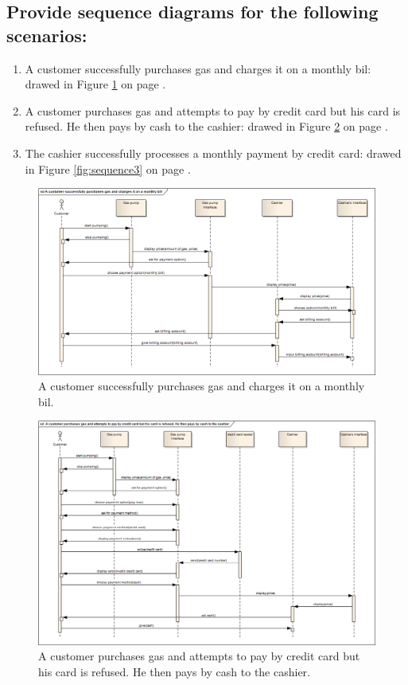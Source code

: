 \documentclass[11pt,a4paper]{article}
\begin{document}
\subsection*{Provide sequence diagrams for the following scenarios:}
\begin{enumerate}
	\item A customer successfully purchases gas and charges it on a monthly bil: drawed in Figure \ref{fig:sequence1} on page \pageref{fig:sequence1}.
	\item A customer purchases gas and attempts to pay by credit card but his card is refused. He then pays by cash to the cashier: drawed in Figure \ref{fig:sequence2} on page \pageref{fig:sequence2}.
	\item The cashier successfully processes a monthly payment by credit card: drawed in Figure \ref{fig:sequence3} on page \pageref{fig:sequence3}.
\end{enumerate}
	

\begin{figure}[H]
 \centering
 \includegraphics[width=\textwidth]{../sequence1.png} 
 \caption{A customer successfully purchases gas and charges it on a monthly bil.}
 \label{fig:sequence1}
\end{figure}


\begin{figure}[H]
 \centering
 \includegraphics[width=\textwidth]{../sequence2.png} 
 \caption{A customer purchases gas and attempts to pay by credit card but his card is refused. He then pays by cash to the cashier.}
 \label{fig:sequence2}
\end{figure}
\end{document}
